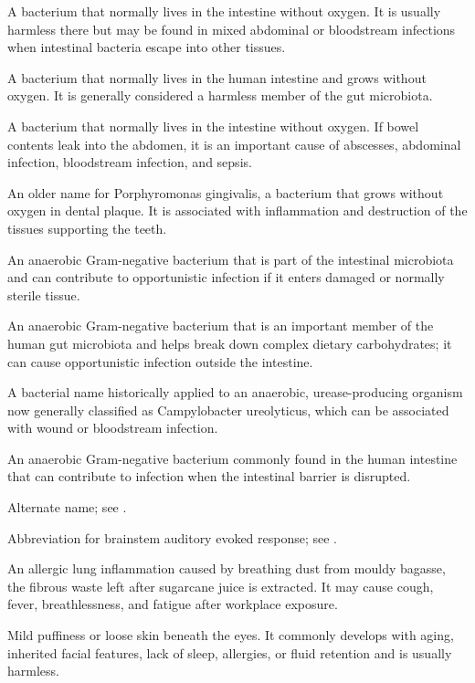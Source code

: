  A bacterium that normally lives in the intestine without oxygen. It is usually harmless there but may be found in mixed abdominal or bloodstream infections when intestinal bacteria escape into other tissues.

 A bacterium that normally lives in the human intestine and grows without oxygen. It is generally considered a harmless member of the gut microbiota.

 A bacterium that normally lives in the intestine without oxygen. If bowel contents leak into the abdomen, it is an important cause of abscesses, abdominal infection, bloodstream infection, and sepsis.

 An older name for Porphyromonas gingivalis, a bacterium that grows without oxygen in dental plaque. It is associated with inflammation and destruction of the tissues supporting the teeth.

 An anaerobic Gram-negative bacterium that is part of the intestinal microbiota and can contribute to opportunistic infection if it enters damaged or normally sterile tissue.

 An anaerobic Gram-negative bacterium that is an important member of the human gut microbiota and helps break down complex dietary carbohydrates; it can cause opportunistic infection outside the intestine.

 A bacterial name historically applied to an anaerobic, urease-producing organism now generally classified as Campylobacter ureolyticus, which can be associated with wound or bloodstream infection.

 An anaerobic Gram-negative bacterium commonly found in the human intestine that can contribute to infection when the intestinal barrier is disrupted.

 Alternate name; see .

 Abbreviation for brainstem auditory evoked response; see .

 An allergic lung inflammation caused by breathing dust from mouldy bagasse, the fibrous waste left after sugarcane juice is extracted. It may cause cough, fever, breathlessness, and fatigue after workplace exposure.

 Mild puffiness or loose skin beneath the eyes. It commonly develops with aging, inherited facial features, lack of sleep, allergies, or fluid retention and is usually harmless.

